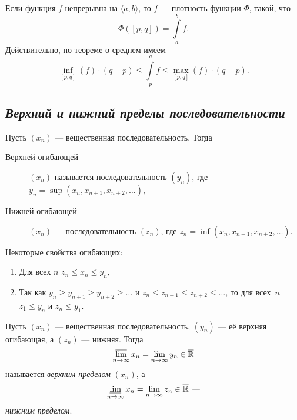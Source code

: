 \begin{example}
	Если функция \(f\) непрерывна на \(\langle a, b \rangle\), то \(f\) --- плотность функции \(\Phi\), такой, что \[
	\Phi([p, q]) = \int\limits_a^b f.
	\]
	Действительно, по \hyperlink{sredneye}{теореме о среднем} имеем\[
	\inf_{[p, q]} (f) \cdot (q - p) \leqslant \int\limits_p^q f \leqslant \max_{[p, q]} (f) \cdot (q - p).
	\]
\end{example}

\subsection{\itshape Верхний и нижний пределы последовательности}

\begin{ndefinition}
	Пусть \((x_n)\) --- вещественная последовательность. Тогда 
	\begin{description}
		\item[Верхней огибающей] \((x_n)\) называется последовательность \((y_n)\), где \(y_n = \sup (x_n, x_{n + 1}, x_{n + 2}, \ldots)\),
		\item[Нижней огибающей] \((x_n)\) --- последовательность \((z_n)\), где \(z_n = \inf (x_n, x_{n + 1}, x_{n + 2}, \ldots)\).
	\end{description}
\end{ndefinition}

\begin{remark}
	Некоторые свойства огибающих:
	\begin{enumerate}
		\item Для всех \(n\) \(z_n \leqslant x_n \leqslant y_n\),
		\item Так как \(y_n \geqslant y_{n + 1} \geqslant y_{n + 2} \geqslant \ldots\) и \(z_n \leqslant z_{n + 1} \leqslant z_{n + 2} \leqslant \ldots\), то для всех~\(n\) \(z_1 \leqslant y_n\) и \(z_n \leqslant y_1\).
	\end{enumerate}
\end{remark}

\begin{ndefinition}
	Пусть \((x_n)\) --- вещественная последовательность, \((y_n)\) --- её верхняя огибающая, а \((z_n)\) --- нижняя. Тогда \[
	\varlimsup_{n \to \infty} x_n = \lim_{n \to \infty} y_n \in \overline{\mathbb{R}}
	\]
	называется \textit{верхним пределом} \((x_n)\), а \[
	\varliminf\limits_{n \to \infty} x_n = \lim\limits_{n \to \infty} z_n \in \overline{\mathbb{R}} \ \textit{---}
	\]
	\textit{нижним пределом}.
\end{ndefinition}

